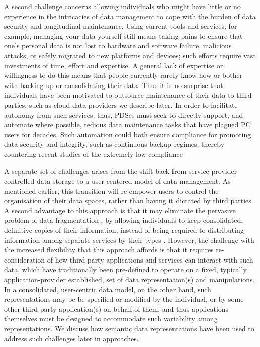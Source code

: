 \documentclass[runningheads,a4paper]{llncs}
\begin{document}
A second challenge concerns allowing individuals who might have little or no experience in the intricacies of data management to cope with the burden of data security and longitudinal maintenance.  Using current tools and services, for example, managing your data yourself still means taking pains to ensure that one's personal data is not lost to hardware and software failure, malicious attacks, or safely migrated to new platforms and devices; such efforts require vast investments of time, effort and expertise.  A general lack of expertise or willingness to do this  means that people currently rarely know how or bother with backing up or consolidating their data. Thus it is no surprise that individuals have been motivated to outsource maintenance of their data to third parties, such as cloud data providers we describe later.  In order to facilitate autonomy from such services, thus, PDSes must seek to directly support, and automate where possible, tedious data maintenance tasks that have plagued PC users for decades.  Such automation could both ensure compliance for promoting data security and integrity, such as continuous backup regimes, thereby countering recent studies of the extremely low compliance 

A separate set of challenges arises from the shift back from service-provider controlled data storage to a user-centered model of data management. As mentioned earlier, this transition will re-empower users to control the organisation of their data spaces, rather than having it dictated by third parties.  A second advantage to this approach is that it may eliminate the pervasive problem of data fragmentation \cite{jones}, by allowing individuals to keep consolidated, definitive copies of their information, instead of being required to distributing information among separate services by their types \cite{web-fragmentation}.  However, the challenge with the increased flexibility that this approach affords is that it requires re-consideration of how third-party applications and services can interact with such data, which have traditionally been pre-defined to operate on a fixed, typically application-provider established, set of data representation(s) and manipulations.  In a consolidated, user-centric data model, on the other hand, such representations may be be specified or modified by the individual, or by some other third-party application(s) on behalf of them, and thus applications themselves must be designed to accommodate such variability among representations.  We discuss how semantic data representations have been used to address such challenges later in approaches.
\end{document}
